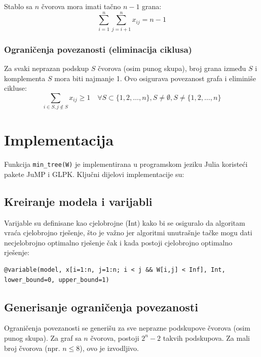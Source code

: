 \documentclass[12pt,a4paper]{article}
\begin{document}
Stablo sa $n$ čvorova mora imati tačno $n-1$ grana:
\begin{equation}
\sum_{i=1}^{n} \sum_{j=i+1}^{n} x_{ij} = n - 1
\end{equation}

\subsubsection{Ograničenja povezanosti (eliminacija ciklusa)}

Za svaki neprazan podskup $S$ čvorova (osim punog skupa), broj grana između $S$ i komplementa $S$ mora biti najmanje 1. Ovo osigurava povezanost grafa i eliminiše cikluse:
\begin{equation}
\sum_{i \in S, j \notin S} x_{ij} \geq 1 \quad \forall S \subset \{1, 2, \ldots, n\}, S \neq \emptyset, S \neq \{1, 2, \ldots, n\}
\end{equation}

\section{Implementacija}

Funkcija \texttt{min\_tree(W)} je implementirana u programskom jeziku Julia koristeći pakete JuMP i GLPK. Ključni dijelovi implementacije su:

\subsection{Kreiranje modela i varijabli}

Varijable su definisane kao cjelobrojne (Int) kako bi se osiguralo da algoritam vraća cjelobrojno rješenje, što je važno jer algoritmi unutrašnje tačke mogu dati necjelobrojno optimalno rješenje čak i kada postoji cjelobrojno optimalno rješenje:

\begin{lstlisting}[style=julia]
@variable(model, x[i=1:n, j=1:n; i < j && W[i,j] < Inf], Int, lower_bound=0, upper_bound=1)
\end{lstlisting}

\subsection{Generisanje ograničenja povezanosti}

Ograničenja povezanosti se generišu za sve neprazne podskupove čvorova (osim punog skupa). Za graf sa $n$ čvorova, postoji $2^n - 2$ takvih podskupova. Za mali broj čvorova (npr. $n \leq 8$), ovo je izvodljivo.
\end{document}
